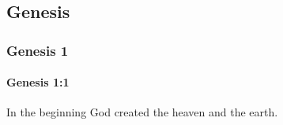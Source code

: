 \subsection{Genesis}
	\label{SCRIPT-GEN}

	\subsubsection{Genesis 1} %
		\label{SCRIPT-GEN-1}
	
		\paragraph{Genesis 1:1} %
			\label{SCRIPT-GEN-1-1}

			In the beginning God created the heaven and the earth.